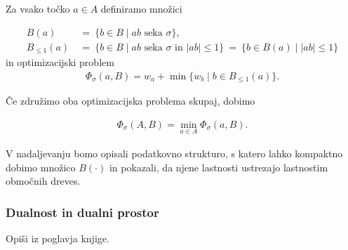 \documentclass[a4paper, 12pt]{book}
\begin{document}
Za vsako točko $a\in A$ definiramo množici

\begin{align*}
	B(a)~&=~\{ b\in B\mid \text{$ab$ seka $\sigma$}\},\\
	B_{\le 1}(a)~&=~ \{ b\in B\mid \text{$ab$ seka $\sigma$ in $|ab|\le 1$}\} 
			~=~ \{ b\in B(a)\mid |ab|\le 1\}
\end{align*}
in optimizacijski problem
\begin{align*}
	\Phi_\sigma(a,B) = w_a + \min \{ w_b\mid b\in B_{\le 1}(a)\}.
\end{align*}

Če združimo oba optimizacijska problema skupaj, dobimo

\begin{align*}
	\Phi_\sigma(A,B) = \min_{a\in A} \Phi_\sigma(a,B).
\end{align*}

V nadaljevanju bomo opisali podatkovno strukturo, s katero lahko kompaktno dobimo množico $B(\cdot)$ in pokazali, da njene lastnosti ustrezajo lastnostim območnih dreves.

\subsubsection{Dualnost in dualni prostor}
Opiši iz poglavja knjige.
\end{document}
